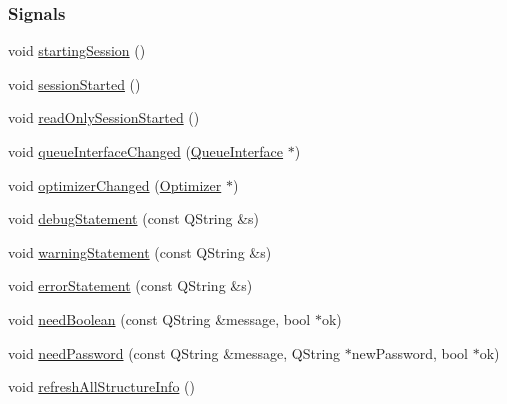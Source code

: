 \subsubsection*{Signals}
\begin{DoxyCompactItemize}
\item 
void \hyperlink{classGlobalSearch_1_1OptBase_ac8b7b372d127a2ba9fada95645b4b4c7}{starting\+Session} ()
\item 
void \hyperlink{classGlobalSearch_1_1OptBase_a7d786f0cf4c5e95ea0b35e3b3c9eb87e}{session\+Started} ()
\item 
void \hyperlink{classGlobalSearch_1_1OptBase_a3d614aba63df12ea0e42e2b5cb0fe050}{read\+Only\+Session\+Started} ()
\item 
void \hyperlink{classGlobalSearch_1_1OptBase_ac1e2aa7f7dc57461fd12ff47b25e7c5c}{queue\+Interface\+Changed} (\hyperlink{classGlobalSearch_1_1QueueInterface}{Queue\+Interface} $\ast$)
\item 
void \hyperlink{classGlobalSearch_1_1OptBase_a8f07729ab8372e2a41de0d38d7947c6a}{optimizer\+Changed} (\hyperlink{classGlobalSearch_1_1Optimizer}{Optimizer} $\ast$)
\item 
void \hyperlink{classGlobalSearch_1_1OptBase_aa194f330e51154ce95a6cabb7fa4fccc}{debug\+Statement} (const Q\+String \&s)
\item 
void \hyperlink{classGlobalSearch_1_1OptBase_a70a45deb53ed3dbd6a1c2c458ea88afe}{warning\+Statement} (const Q\+String \&s)
\item 
void \hyperlink{classGlobalSearch_1_1OptBase_a6bcbb9a259f9173084e2f4a82ffa0b86}{error\+Statement} (const Q\+String \&s)
\item 
void \hyperlink{classGlobalSearch_1_1OptBase_a771c4b00f1fd857750ccb3d48116334d}{need\+Boolean} (const Q\+String \&message, bool $\ast$ok)
\item 
void \hyperlink{classGlobalSearch_1_1OptBase_aa140b7676a1fee73e1d416c164232fb3}{need\+Password} (const Q\+String \&message, Q\+String $\ast$new\+Password, bool $\ast$ok)
\item 
void \hyperlink{classGlobalSearch_1_1OptBase_a3d04c32b50632a6745cc013cf91d2551}{refresh\+All\+Structure\+Info} ()
\end{DoxyCompactItemize}
